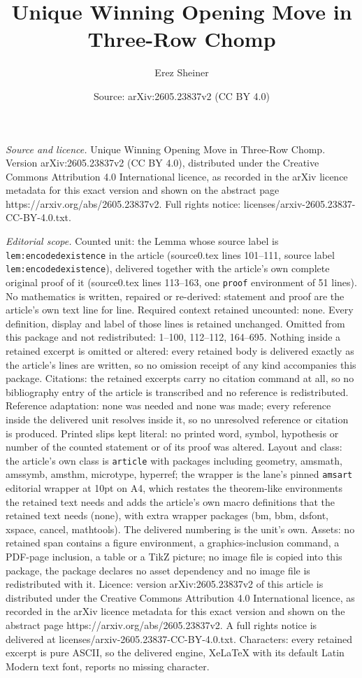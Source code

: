 \documentclass[10pt,a4paper]{amsart}
\title[Unique Winning Opening Move in Three-Row Chomp]{Unique Winning Opening Move in Three-Row Chomp}
\author{Erez Sheiner}
\date{Source: arXiv:2605.23837v2 (CC BY 4.0)}
\begin{document}
\maketitle

\noindent\emph{Source and licence.} Unique Winning Opening Move in Three-Row Chomp. Version arXiv:2605.23837v2 (CC BY 4.0), distributed under the Creative Commons Attribution 4.0 International licence, as recorded in the arXiv licence metadata for this exact version and shown on the abstract page https://arxiv.org/abs/2605.23837v2. Full rights notice: licenses/arxiv-2605.23837-CC-BY-4.0.txt.\par\smallskip

\noindent\textit{Editorial scope.} Counted unit: the Lemma whose source label is \texttt{lem:encodedexistence} in the article (source0.tex lines 101--111, source label \texttt{lem:encodedexistence}), delivered together with the article's own complete original proof of it (source0.tex lines 113--163, one \texttt{proof} environment of 51 lines). No mathematics is written, repaired or re-derived: statement and proof are the article's own text line for line. Required context retained uncounted: none. Every definition, display and label of those lines is retained unchanged. Omitted from this package and not redistributed: 1--100, 112--112, 164--695. Nothing inside a retained excerpt is omitted or altered: every retained body is delivered exactly as the article's lines are written, so no omission receipt of any kind accompanies this package. Citations: the retained excerpts carry no citation command at all, so no bibliography entry of the article is transcribed and no reference is redistributed. Reference adaptation: none was needed and none was made; every reference inside the delivered unit resolves inside it, so no unresolved reference or citation is produced. Printed slips kept literal: no printed word, symbol, hypothesis or number of the counted statement or of its proof was altered. Layout and class: the article's own class is \texttt{article} with packages including geometry, amsmath, amssymb, amsthm, microtype, hyperref; the wrapper is the lane's pinned \texttt{amsart} editorial wrapper at 10pt on A4, which restates the theorem-like environments the retained text needs and adds the article's own macro definitions that the retained text needs (none), with extra wrapper packages (bm, bbm, dsfont, xspace, cancel, mathtools). The delivered numbering is the unit's own. Assets: no retained span contains a figure environment, a graphics-inclusion command, a PDF-page inclusion, a table or a TikZ picture; no image file is copied into this package, the package declares no asset dependency and no image file is redistributed with it. Licence: version arXiv:2605.23837v2 of this article is distributed under the Creative Commons Attribution 4.0 International licence, as recorded in the arXiv licence metadata for this exact version and shown on the abstract page https://arxiv.org/abs/2605.23837v2. A full rights notice is delivered at licenses/arxiv-2605.23837-CC-BY-4.0.txt. Characters: every retained excerpt is pure ASCII, so the delivered engine, XeLaTeX with its default Latin Modern text font, reports no missing character.
\end{document}
